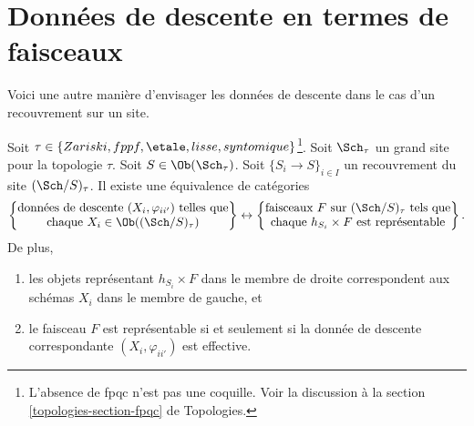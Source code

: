











\section{Données de descente en termes de faisceaux}
\label{section-descent-data-sheaves}


\noindent
Voici une autre manière d'envisager les données de descente dans le cas d'un
recouvrement sur un site.

\begin{lemma}
\label{lemma-descent-data-sheaves}
Soit $\tau \in \{Zariski, fppf, \etale, lisse, syntomique\}$\footnote{L'absence
de fpqc n'est pas une coquille. Voir la discussion à la
section \ref{topologies-section-fpqc} de Topologies.}. Soit $\Sch_\tau$ un grand
site pour la topologie $\tau$. Soit $S \in \Ob(\Sch_\tau)$. Soit
$\{S_i \to S\}_{i \in I}$ un recouvrement du site $(\Sch/S)_\tau$. Il existe
une équivalence de catégories
$$
\left\{
\begin{matrix}
\text{données de descente }(X_i, \varphi_{ii'})\text{ telles que}\\
\text{chaque }X_i \in \Ob((\Sch/S)_\tau)
\end{matrix}
\right\}
\leftrightarrow
\left\{
\begin{matrix}
\text{faisceaux }F\text{ sur }(\Sch/S)_\tau\text{ tels que}\\
\text{chaque }h_{S_i} \times F\text{ est représentable}
\end{matrix}
\right\}.
$$
De plus,
\begin{enumerate}
\item les objets représentant $h_{S_i} \times F$ dans le membre de droite
correspondent aux schémas $X_i$ dans le membre de gauche, et
\item le faisceau $F$ est représentable si et seulement si la donnée de
descente correspondante $(X_i, \varphi_{ii'})$ est effective.
\end{enumerate}
\end{lemma}

